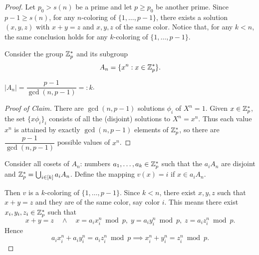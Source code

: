 \begin{proof}
	Let $p_0 > s(n)$ be a prime and let $p \geq p_0$ be another prime. Since $p - 1 \geq s(n)$, for any $n$-coloring of $\{1, \dots, p-1\}$, there exists a solution $(x,y,z)$ with $x+y=z$ and $x,y,z$ of the same color. Notice that, for any $k < n$, the same conclusion holds for any $k$-coloring of $\{1, \dots, p-1\}$.

	Consider the group $\mathbb{Z}_p^*$ and its subgroup
	\[
		A_n = \{ x^n : x \in \mathbb{Z}_p^* \}.
	\]

	\begin{claim}
		$|A_n| = \dfrac{p-1}{\gcd(n, p-1)} =: k$.
	\end{claim}

	\begin{proof}[Proof of Claim]
		There are $\gcd(n, p-1)$ solutions $\phi_i$ of $X^n = 1$. Given $x \in \mathbb{Z}_p^*$, the set $\{x \phi_i\}_i$ consists of all the (disjoint) solutions to $X^n = x^n$. Thus each value $x^n$ is attained by exactly $\gcd(n, p-1)$ elements of $\mathbb{Z}_p^*$, so there are $\dfrac{p-1}{\gcd(n, p-1)}$ possible values of $x^n$.

	\end{proof}

	Consider all cosets of $A_n$: numbers $a_1, \dots, a_k \in \mathbb{Z}_p^*$ such that the $a_i A_n$ are disjoint and $\mathbb{Z}_p^* = \bigcup_{i \in [k]} a_i A_n$. Define the mapping $v(x) = i$ if $x \in a_i A_n$.

	Then $v$ is a $k$-coloring of $\{1, \dots, p-1\}$. Since $k < n$, there exist $x, y, z$ such that $x + y = z$ and they are of the same color, say color $i$. This means there exist $x_i, y_i, z_i \in \mathbb{Z}_p^*$ such that
	\[
		x + y = z \quad \wedge \quad x = a_i x_i^n \bmod p, \; y = a_i y_i^n \bmod p, \; z = a_i z_i^n \bmod p.
	\]
	Hence
	\[
		a_i x_i^n + a_i y_i^n = a_i z_i^n \bmod p \implies x_i^n + y_i^n = z_i^n \bmod p.
	\]
\end{proof}



